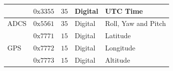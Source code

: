 \begin{table}[bht]
\begin{tabular}{|m{}m{}m{}m{}m{}|}
						&	 $ 0\text{x}3355 $				&	$ 35 $						&	 Digital	 &      UTC Time					      \\
\hline
\multirow{1}{*}{ADCS}   &    $ 0\text{x}5561 $ 				&	$ 35 $						&	 Digital	 &	    Roll, Yaw and Pitch	       		  \\
\hline
\multirow{3}{*}{GPS}    &    $ 0\text{x}7771 $				&	$ 15 $						&	 Digital	 &      Latitude		       	    	  \\
						&    $ 0\text{x}7772 $				&	$ 15 $						&	 Digital	 &      Longitude	   				      \\
						&    $ 0\text{x}7773 $				&	$ 15 $						&    Digital	 &      Altitude  				          \\ 
\hline
\end{tabular}
\end{table}
%

